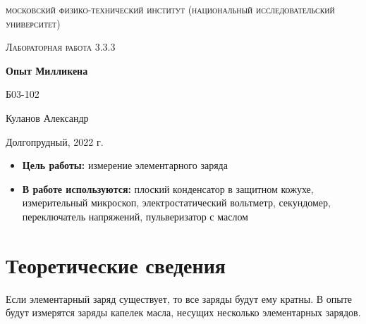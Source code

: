 \documentclass[a4paper, 12pt]{article}
\begin{document}
\begin{titlepage}
	\centering
	\vspace{5cm}
	{\scshape\LARGE московский физико-технический институт (национальный исследовательский университет) \par}
	\vspace{6cm}
	{\scshape\Large Лабораторная работа 3.3.3\par}
	{\huge\bfseries Опыт Милликена \par}
	\vspace{1cm}
	\vfill
\begin{flushright}
	{\large Б03-102}\par
	\vspace{0.3cm}
	{\LARGE Куланов Александр}
\end{flushright}
	

	\vfill


	Долгопрудный, 2022 г.
\end{titlepage}

\begin{itemize}
	\item \textbf{Цель работы:} измерение элементарного заряда
    \item \textbf{В работе используются:} плоский конденсатор в защитном кожухе, измерительный микроскоп, электростатический вольтметр,
    секундомер, переключатель напряжений, пульверизатор с маслом
    
\end{itemize}

\section{Теоретические сведения}

Если элементарный заряд существует, то все заряды будут ему кратны. В опыте будут измерятся заряды капелек масла, несущих несколько элементарных зарядов.
\end{document}
